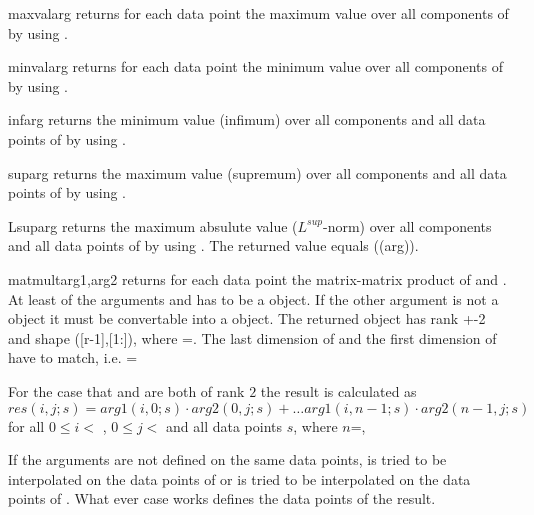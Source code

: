 \begin{funcdesc}{maxval}{arg}
returns for each data point the maximum value over all components of
\Data {} by using .  
\end{funcdesc}

\begin{funcdesc}{minval}{arg}
returns for each data point the minimum value over all components of
\Data {} by using .  
\end{funcdesc}

\begin{funcdesc}{inf}{arg}
returns the minimum value (infimum) over all components and all data
points of \Data {} by using .
\end{funcdesc}

\begin{funcdesc}{sup}{arg}
returns the maximum value (supremum) over all components and all data
points of \Data {} by using .
\end{funcdesc}

\begin{funcdesc}{Lsup}{arg}
returns the maximum absulute value ($L^{sup}$-norm) over all
components and all data points of \Data {} by using
.  The returned value equals
(\function(arg)).  
\end{funcdesc}

\begin{funcdesc}{matmult}{arg1,arg2}
returns for each data point the matrix-matrix product of 
and  . At least of the
arguments  and  has to be a \Data
object. If the other argument is not a \Data object it must be
convertable into a \Data object. The returned \Data
object has rank +-2 and shape
([r-1],[1:]), where
=. The last dimension of  and the
first dimension of  have to match,
i.e. =

For the case that  and  are both of rank $2$ the
result  is calculated as
\begin{equation}
res(i,j;s)=
arg1(i,0;s) \cdot arg2(0,j;s)+
\ldots
arg1(i,n-1;s) \cdot arg2(n-1,j;s)
\end{equation}
for all $0\le i <$ , $0\le j <$
 and all data points $s$, where
$n$=,

If the arguments are not defined on the same data points, 
is tried to be interpolated on the data points of  or
 is tried to be interpolated on the data points of
. What ever case works defines the data points of the
result.
\end{funcdesc}

